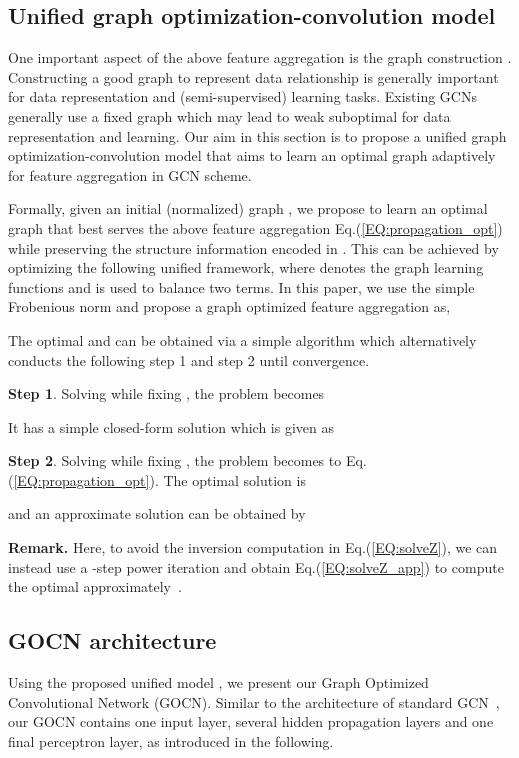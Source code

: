 \documentclass{article}
\begin{document}
\subsection{Unified graph optimization-convolution model}

One important aspect of the above feature aggregation is the graph construction .
Constructing a good graph to represent data relationship is generally important for data representation and (semi-supervised) learning tasks.
Existing GCNs generally  use a fixed graph which may lead to weak suboptimal for data representation and learning. Our aim in this section is to propose a unified graph optimization-convolution model that aims to learn an optimal graph adaptively for feature aggregation in GCN  scheme.

Formally, given an initial (normalized) graph , we propose to learn an optimal graph  that best serves the above feature aggregation Eq.(\ref{EQ:propagation_opt}) while preserving the structure information encoded in .
This can be achieved by optimizing the following unified framework, 
where   denotes the graph learning functions and  is used to balance two terms.
In this paper, we use the simple Frobenious norm and propose a graph optimized feature aggregation as,

The optimal  and  can be obtained via a simple algorithm which alternatively conducts the following {step 1} and {step 2} until convergence.

\noindent \textbf{Step 1}. Solving  while fixing , the problem becomes

It has a simple closed-form solution which is given as 

\noindent \textbf{Step 2}. Solving  while fixing , the problem becomes
to Eq.(\ref{EQ:propagation_opt}). The optimal solution is

and an approximate solution can be obtained by


\noindent \textbf{Remark.} Here, to avoid the inversion computation in Eq.(\ref{EQ:solveZ}), we can instead use a -step power iteration and obtain Eq.(\ref{EQ:solveZ_app}) to compute the optimal  approximately~\cite{LCL}. 



\subsection{GOCN architecture}


Using the proposed unified model , we present our Graph Optimized Convolutional Network (GOCN).
Similar to the architecture of standard GCN~\cite{kipf2016semi}, our GOCN contains one input layer, several hidden propagation layers and one final perceptron layer, as introduced in the following.
\end{document}

